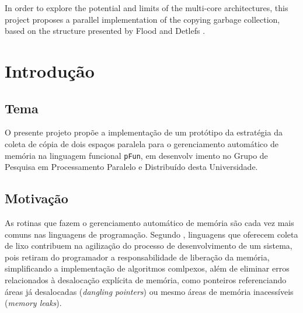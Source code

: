 \documentclass[ccc, pg2]{esinucpel}
\begin{document}
\begin{englishabstract}

In order to explore the potential and limits of the multi-core architectures, this project proposes a parallel implementation of the copying garbage collection, based on the structure presented by Flood and Detlefs \cite{bib:flood:pargc}. %
\end{englishabstract}

\chapter{Introdução}

\section{Tema}
O presente projeto propõe a implementação de um protótipo da estratégia da coleta de cópia de dois espaços paralela para o gerenciamento automático de memória na linguagem funcional {\tt pFun}, em desenvolv imento no Grupo de Pesquisa em Processamento Paralelo e Distribuído desta Universidade.

\section{Motivação}
As rotinas que fazem o gerenciamento automático de memória são cada vez mais comuns nas linguagens de programação. Segundo \cite{bib:marcos}, linguagens que oferecem coleta de lixo contribuem na agilização do processo de desenvolvimento de um sistema, pois retiram do programador a responsabilidade de liberação da memória, simplificando a implementação de algoritmos comlpexos, além de eliminar erros relacionados à desalocação explícita de memória, como ponteiros referenciando áreas já desalocadas (\textit{dangling pointers}) ou mesmo áreas de memória inacessíveis (\textit{memory leaks}).

\end{document}
